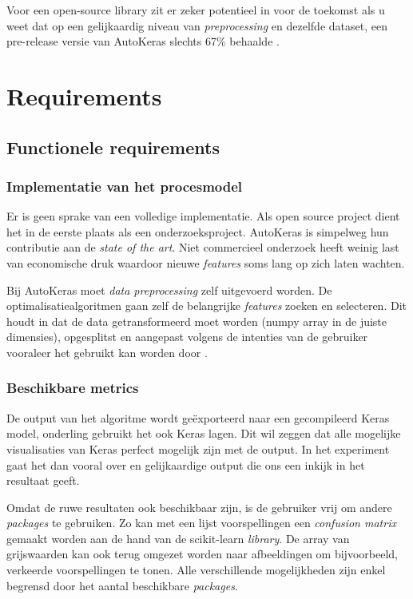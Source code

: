 Voor een open-source library zit er zeker potentieel in voor de toekomst als u weet dat op een gelijkaardig niveau van \textit{preprocessing} en dezelfde dataset, een pre-release versie van AutoKeras slechts 67\% behaalde \autocite{Chopra2019}.

\section{Requirements}

\subsection{Functionele requirements}
\label{subsec:autokeras-fr}

\subsubsection{Implementatie van het procesmodel}
\label{sucsubsec:autokeras-fr-procesmodel}

Er is geen sprake van een volledige implementatie. Als open source project dient het in de eerste plaats als een onderzoeksproject. AutoKeras is simpelweg hun contributie aan de \textit{state of the art}. Niet commercieel onderzoek heeft weinig last van economische druk waardoor nieuwe \textit{features} soms lang op zich laten wachten. 

Bij AutoKeras moet \textit{data preprocessing} zelf uitgevoerd worden. De optimalisatiealgoritmen gaan zelf de belangrijke \textit{features} zoeken en selecteren. Dit houdt in dat de data getransformeerd moet worden (numpy array in de juiste dimensies), opgesplitst en aangepast volgens de intenties van de gebruiker vooraleer het gebruikt kan worden door .

\subsubsection{Beschikbare metrics}
\label{sucsubsec:autokeras-fr-metrics}

De output van het algoritme wordt geëxporteerd naar een gecompileerd Keras model, onderling gebruikt het ook Keras lagen. Dit wil zeggen dat alle mogelijke visualisaties van Keras perfect mogelijk zijn met de output. In het experiment gaat het dan vooral over  en gelijkaardige output die ons een inkijk in het resultaat geeft.

Omdat de ruwe resultaten ook beschikbaar zijn, is de gebruiker vrij om andere \textit{packages} te gebruiken. Zo kan met een lijst voorspellingen een \textit{confusion matrix} gemaakt worden aan de hand van de scikit-learn \textit{library}. De array van grijswaarden kan ook terug omgezet worden naar afbeeldingen om bijvoorbeeld, verkeerde voorspellingen te tonen. Alle verschillende mogelijkheden zijn enkel begrensd door het aantal beschikbare \textit{packages}.

